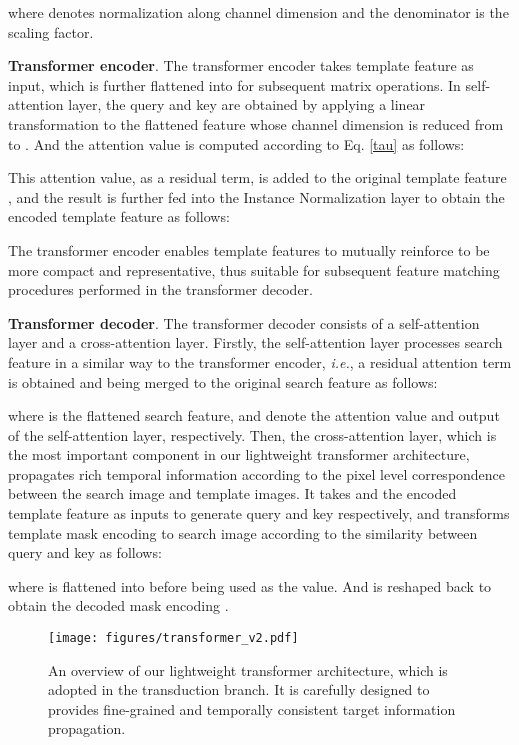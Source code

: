 \documentclass[10pt,twocolumn,letterpaper]{article}
\begin{document}
where  denotes  normalization along channel dimension and the denominator  is the scaling factor.

\noindent\textbf{Transformer encoder}.
The transformer encoder takes template feature  as input, which is further flattened into  for subsequent matrix operations. In self-attention layer, the query and key are obtained by applying a linear transformation  to the flattened feature  whose channel dimension is reduced from  to . And the attention value  is computed according to Eq. \eqref{tau} as follows:

This attention value, as a residual term, is added to the original template feature , and the result is further fed into the Instance Normalization \cite{instnorm2016A} layer to obtain the encoded template feature  as follows:

The transformer encoder enables template features to mutually reinforce to be more compact and representative, thus suitable for subsequent feature matching procedures performed in the transformer decoder.


\noindent\textbf{Transformer decoder}.
The transformer decoder consists of a self-attention layer and a cross-attention layer. Firstly, the self-attention layer processes search feature  in a similar way to the transformer encoder, \textit{i.e.}, a residual attention term is obtained and being merged to the original search feature as follows:

where  is the flattened search feature,  and  denote the attention value and output of the self-attention layer, respectively. Then, the cross-attention layer, which is the most important component in our lightweight transformer architecture, propagates rich temporal information according to the pixel level correspondence between the search image and template images. It takes   and the encoded template feature  as inputs to generate query  and key  respectively, and transforms template mask encoding  to search image according to the similarity between query and key as follows:

where  is flattened into  before being used as the value. And  is reshaped back to obtain the decoded mask encoding . 

\begin{figure}[t]
	\begin{center}
	\texttt{[image: figures/transformer\_v2.pdf]}
	\vspace{-2.0em}
	\end{center}
	\caption{An overview of our lightweight transformer architecture, which is adopted in the transduction branch. It is carefully designed to provides fine-grained and temporally consistent target information propagation.}
	\label{fig:transformer}
	\vspace{-0.5em}
\end{figure}
\end{document}
